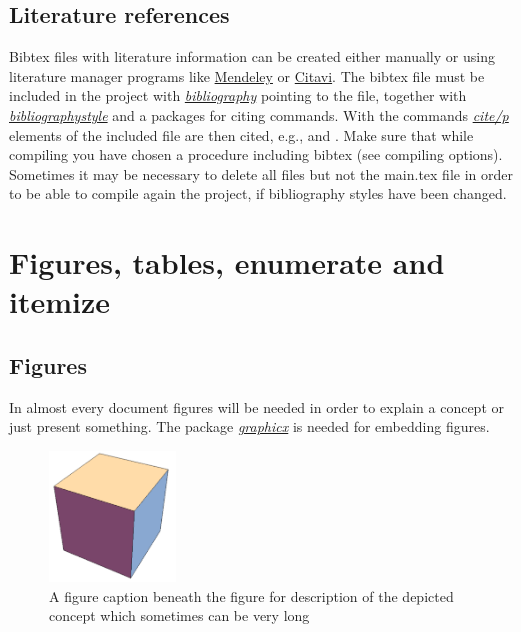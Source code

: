 \documentclass[a4paper]{book}
\newcommand{\imp}[1]{\underline{\textit{#1}}}
\begin{document}

\section{Literature references}

Bibtex files with literature information can be created either manually or using literature manager programs like \href{http://www.mendeley.com/}{Mendeley} or \href{http://citavi.com/en/index.html}{Citavi}. The bibtex file must be included in the project with \imp{bibliography} pointing to the file, together with \imp{bibliographystyle} and a packages for citing commands. With the commands \imp{cite/p} elements of the included file are then cited, e.g., \cite{Hill1952} and \citep{Kroner1977}. Make sure that while compiling you have chosen a procedure including bibtex (see compiling options). Sometimes it may be necessary to delete all files but not the main.tex file in order to be able to compile again the project, if bibliography styles have been changed.


\chapter{Figures, tables, enumerate and itemize}


\section{Figures}

In almost every document figures will be needed in order to explain a concept or just present something. The package \imp{graphicx} is needed for embedding figures.

\begin{figure}[!h]
	\centering
	\includegraphics[width=0.3\textwidth]{figures/cube}
	\caption{A figure caption beneath the figure for description of the depicted concept which sometimes can be very long}
	\label{ft_fig_firstfig}
\end{figure}
\end{document}
